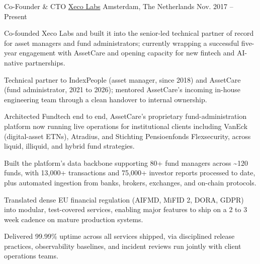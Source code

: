 

\begin{cventries}

  \cventry
    {Co-Founder \& CTO} %
    {\href{https://www.xecolabs.com}{Xeco Labs}} %
    {Amsterdam, The Netherlands} %
    {Nov. 2017 -- Present} %
    {
      \begin{cvitems} %
        \item {Co-founded Xeco Labs and built it into the senior-led technical partner of record for asset managers and fund administrators; currently wrapping a successful five-year engagement with AssetCare and opening capacity for new fintech and AI-native partnerships.}
        \item {Technical partner to IndexPeople (asset manager, since 2018) and AssetCare (fund administrator, 2021 to 2026); mentored AssetCare's incoming in-house engineering team through a clean handover to internal ownership.}
        \item {Architected Fundtech end to end, AssetCare's proprietary fund-administration platform now running live operations for institutional clients including VanEck (digital-asset ETNs), Atradius, and Stichting Pensioenfonds Flexsecurity, across liquid, illiquid, and hybrid fund strategies.}
        \item {Built the platform's data backbone supporting 80+ fund managers across \textasciitilde120 funds, with 13,000+ transactions and 75,000+ investor reports processed to date, plus automated ingestion from banks, brokers, exchanges, and on-chain protocols.}
        \item {Translated dense EU financial regulation (AIFMD, MiFID 2, DORA, GDPR) into modular, test-covered services, enabling major features to ship on a 2 to 3 week cadence on mature production systems.}
        \item {Delivered 99.99\% uptime across all services shipped, via disciplined release practices, observability baselines, and incident reviews run jointly with client operations teams.}
      \end{cvitems}
    }


\end{cventries}
